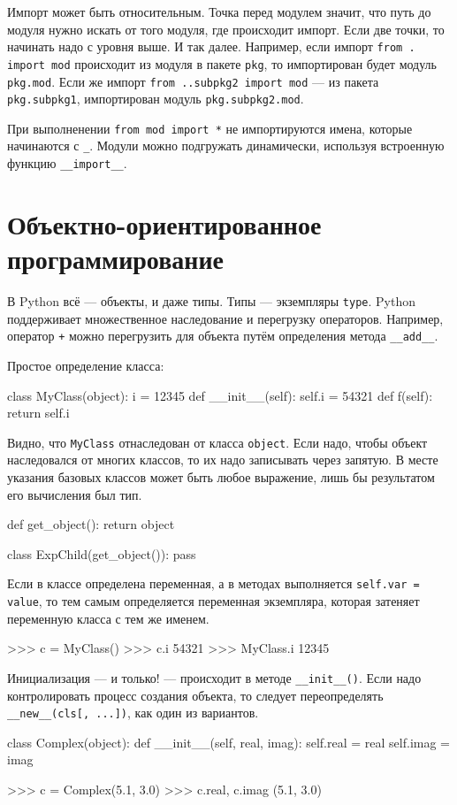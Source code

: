 Импорт может быть относительным. Точка перед модулем значит, что путь до модуля нужно искать от того модуля, где происходит импорт. Если две точки, то начинать надо с уровня выше. И так далее. Например, если импорт \lstinline{from . import mod} происходит из модуля в пакете \lstinline{pkg}, то импортирован будет модуль \lstinline{pkg.mod}. Если же импорт \lstinline{from ..subpkg2 import mod} --- из пакета \lstinline{pkg.subpkg1}, импортирован модуль \lstinline{pkg.subpkg2.mod}.

При выполненении \lstinline{from mod import *} не импортируются имена, которые начинаются с \lstinline{_}. Модули можно подгружать динамически, используя встроенную функцию \lstinline{__import__}.


\section{Объектно-ориентированное программирование}
\label{sec:py-oop}
В Python всё --- объекты, и даже типы. Типы --- экземпляры \lstinline{type}. Python поддерживает множественное наследование и перегрузку операторов. Например, оператор \lstinline{+} можно перегрузить для объекта путём определения метода \lstinline{__add__}.

Простое определение класса:
\begin{pylst}{}{}
class MyClass(object):
    i = 12345
    def __init__(self):
        self.i = 54321
    def f(self):
        return self.i
\end{pylst}

Видно, что \lstinline{MyClass} отнаследован от класса \lstinline{object}. Если надо, чтобы объект наследовался от многих классов, то их надо записывать через запятую. В месте указания базовых классов может быть любое выражение, лишь бы результатом его вычисления был тип.
\begin{pylst}{}{}
def get_object():
    return object

class ExpChild(get_object()):
    pass
\end{pylst}

Если в классе определена переменная, а в методах выполняется \lstinline{self.var = value}, то тем самым определяется переменная экземпляра, которая затеняет переменную класса с тем же именем.
\begin{pylst}{}{}
>>> c = MyClass()
>>> c.i
54321
>>> MyClass.i
12345
\end{pylst}

Инициализация --- и только! --- происходит в методе \lstinline{__init__()}. Если надо контролировать процесс создания объекта, то следует переопределять \lstinline{__new__(cls[, ...])}, как один из вариантов.
\begin{pylst}{}{}
class Complex(object):
    def __init__(self, real, imag):
        self.real = real
        self.imag = imag

>>> c = Complex(5.1, 3.0)
>>> c.real, c.imag
(5.1, 3.0)
\end{pylst}

